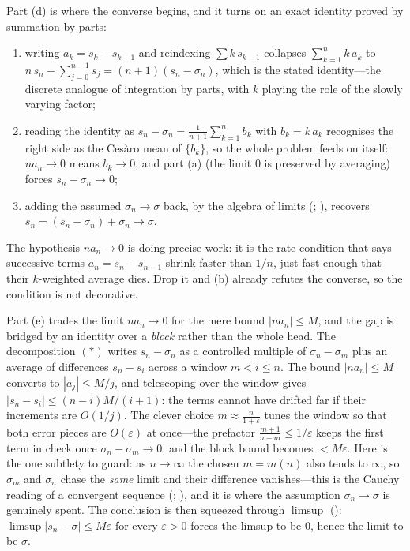 \documentclass[main.tex]{subfiles}
\begin{document}
\begin{Reflection}
Part (d) is where the converse begins, and it turns on an exact identity proved by summation by parts:
\begin{enumerate}[leftmargin=1.7em,itemsep=3pt,topsep=2pt,label=\textnormal{(\arabic*)}]
  \item writing $a_{k}=s_{k}-s_{k-1}$ and reindexing $\sum k\,s_{k-1}$ collapses
        $\sum_{k=1}^{n}k\,a_{k}$ to $n\,s_{n}-\sum_{j=0}^{n-1}s_{j}=(n+1)(s_{n}-\sigma_{n})$, which is the
        stated identity---the discrete analogue of integration by parts, with $k$ playing the role of the
        slowly varying factor;
  \item reading the identity as $s_{n}-\sigma_{n}=\frac{1}{n+1}\sum_{k=1}^{n}b_{k}$ with $b_{k}=k\,a_{k}$
        recognises the right side as the Ces\`aro mean of $\{b_{k}\}$, so the whole problem feeds on
        itself: $na_{n}\to 0$ means $b_{k}\to 0$, and part (a) (the limit $0$ is preserved by averaging)
        forces $s_{n}-\sigma_{n}\to 0$;
  \item adding the assumed $\sigma_{n}\to\sigma$ back, by the algebra of limits
        (; ), recovers
        $s_{n}=(s_{n}-\sigma_{n})+\sigma_{n}\to\sigma$.
\end{enumerate}
The hypothesis $na_{n}\to 0$ is doing precise work: it is the rate condition that says successive terms
$a_{n}=s_{n}-s_{n-1}$ shrink faster than $1/n$, just fast enough that their $k$-weighted average dies. Drop
it and (b) already refutes the converse, so the condition is not decorative.

Part (e) trades the limit $na_{n}\to 0$ for the mere bound $|na_{n}|\le M$, and the gap is bridged by an
identity over a \emph{block} rather than the whole head. The decomposition $(\ast)$ writes $s_{n}-\sigma_{n}$
as a controlled multiple of $\sigma_{n}-\sigma_{m}$ plus an average of differences $s_{n}-s_{i}$ across a
window $m<i\le n$. The bound $|na_{n}|\le M$ converts to $|a_{j}|\le M/j$, and telescoping over the window
gives $|s_{n}-s_{i}|\le (n-i)M/(i+1)$: the terms cannot have drifted far if their increments are
$O(1/j)$. The clever choice $m\approx\frac{n}{1+\varepsilon}$ tunes the window so that both error pieces are
$O(\varepsilon)$ at once---the prefactor $\frac{m+1}{n-m}\le 1/\varepsilon$ keeps the first term in check
once $\sigma_{n}-\sigma_{m}\to 0$, and the block bound becomes $<M\varepsilon$. Here is the one subtlety to
guard: as $n\to\infty$ the chosen $m=m(n)$ also tends to $\infty$, so $\sigma_{m}$ and $\sigma_{n}$ chase
the \emph{same} limit and their difference vanishes---this is the Cauchy reading of a convergent sequence
(; ), and it is where the assumption
$\sigma_{n}\to\sigma$ is genuinely spent. The conclusion is then squeezed through $\limsup$
(): $\limsup|s_{n}-\sigma|\le M\varepsilon$ for every $\varepsilon>0$ forces the limsup to be
$0$, hence the limit to be $\sigma$.


\end{Reflection}
\end{document}
